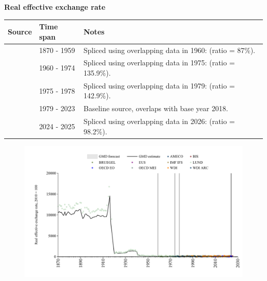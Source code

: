 \documentclass[12pt,a4paper,landscape]{article}
\begin{document}
\begin{adjustbox}{max totalsize={\paperwidth}{\paperheight},center}
\begin{minipage}[t][\textheight][t]{\textwidth}
\vspace*{0.5cm}
{}
\begin{center}
{\Large\bfseries Real effective exchange rate}
\end{center}
\vspace{0.5cm}
\begin{table}[H]
\centering
\small
\begin{tabular}{|l|l|l|}
\hline
\textbf{Source} & \textbf{Time span} & \textbf{Notes} \\
\hline
\rowcolor{white}\cite{LUND}& 1870 - 1959 &Spliced using overlapping data in 1960: (ratio = 87\%). \\
\rowcolor{lightgray}\cite{BRUEGEL}& 1960 - 1974 &Spliced using overlapping data in 1975: (ratio = 135.9\%). \\
\rowcolor{white}\cite{WDI_ARC}& 1975 - 1978 &Spliced using overlapping data in 1979: (ratio = 142.9\%). \\
\rowcolor{lightgray}\cite{WDI}& 1979 - 2023 &Baseline source, overlaps with base year 2018. \\
\rowcolor{white}\cite{BIS}& 2024 - 2025 &Spliced using overlapping data in 2026: (ratio = 98.2\%). \\
\hline
\end{tabular}
\end{table}
\begin{figure}[H]
\centering
\includegraphics[width=\textwidth,height=0.6\textheight,keepaspectratio]{graphs/FIN_REER.pdf}
\end{figure}
\end{minipage}
\end{adjustbox}
\end{document}

